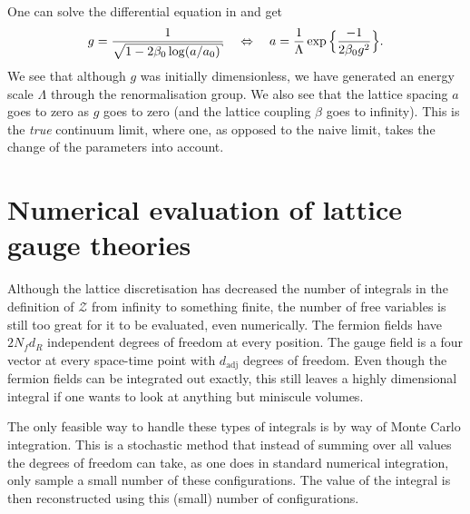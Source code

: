 %
One can solve the differential equation in  and get
%
\begin{equation} \label{eq-running-coupling}
  g = \frac{1}{\sqrt{1 - 2\beta_0 \log (a/a_0)}}
    \hskip1em\Leftrightarrow\hskip1em
    a = \frac{1}{\Lambda} \exp\Big\{\frac{-1}{2\beta_0 g^2}\Big\} .
\end{equation}
%
We see that although $g$ was initially dimensionless, we have generated an
energy scale $\Lambda$ through the renormalisation group. We also see that the
lattice spacing $a$ goes to zero as $g$ goes to zero (and the lattice coupling
$\beta$ goes to infinity). This is the \emph{true} continuum limit, where one, as
opposed to the naive limit, takes the change of the parameters into account.

\section{Numerical evaluation of lattice gauge theories}
\label{sec-numerical_eval}

Although the lattice discretisation has decreased the number of integrals in the
definition of $\mathcal{Z}$ from infinity to something finite, the number of free
variables is still too great for it to be evaluated, even numerically. The
fermion fields have $2 N_f d_R$ independent degrees of freedom at every
position. The gauge field is a four vector at every space-time point with
$d_{\text{adj}}$ degrees of freedom. Even though the fermion fields can be
integrated out exactly, this still leaves a highly dimensional integral if one
wants to look at anything but miniscule volumes.

The only feasible way to handle these types of integrals is by way of Monte
Carlo integration. This is a stochastic method that instead of summing over all
values the degrees of freedom can take, as one does in standard numerical
integration, only sample a small number of these configurations. The value of
the integral is then reconstructed using this (small) number of configurations.

